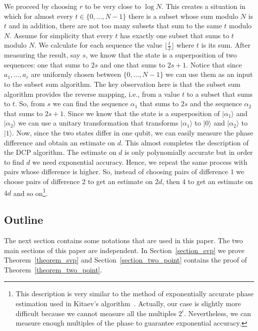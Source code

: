 \documentclass[11pt]{article}
\newcommand\ket[1]{{ |{#1} \rangle }}
\begin{document}
We proceed by choosing $r$ to be very close to $\log N$. This creates a situation in which for almost every
$t\in\{0,\ldots,N-1\}$ there is a subset whose sum modulo $N$ is $t$ and in addition, there are not too many subsets
that sum to the same $t$ modulo $N$. Assume for simplicity that every $t$ has exactly one subset that sums to $t$
modulo $N$. We calculate for each sequence the value $\lfloor \frac{t}{2} \rfloor$ where $t$ is its sum. After
measuring the result, say $s$, we know that the state is a superposition of two sequences: one that sums to $2s$ and
one that sums to $2s+1$. Notice that since $a_1,\ldots,a_r$ are uniformly chosen between $\{0,\ldots,N-1\}$ we can use
them as an input to the subset sum algorithm. The key observation here is that the subset sum algorithm provides the
reverse mapping, i.e., from a value $t$ to a subset that sums to $t$. So, from $s$ we can find the sequence $\alpha_1$
that sums to $2s$ and the sequence $\alpha_2$ that sums to $2s+1$. Since we know that the state is a superposition of
$\ket{\alpha_1}$ and $\ket{\alpha_2}$ we can use a unitary transformation that transforms $\ket{\alpha_1}$ to $\ket{0}$
and $\ket{\alpha_2}$ to $\ket{1}$. Now, since the two states differ in one qubit, we can easily measure the phase
difference and obtain an estimate on $d$. This almost completes the description of the DCP algorithm. The estimate on
$d$ is only polynomially accurate but in order to find $d$ we need exponential accuracy. Hence, we repeat the same
process with pairs whose difference is higher. So, instead of choosing pairs of difference $1$ we choose pairs of
difference $2$ to get an estimate on $2d$, then $4$ to get an estimate on $4d$ and so on\footnote{This description is
very similar to the method of exponentially accurate phase estimation used in Kitaev's
algorithm~\cite{KitaevAbelianSubgroup}. Actually, our case is slightly more difficult because we cannot measure all the
multiples $2^i$. Nevertheless, we can measure enough multiples of the phase to guarantee exponential accuracy.}.

\subsection*{Outline}

The next section contains some notations that are used in this paper. The two main sections of this paper are
independent. In Section~\ref{section_svp} we prove Theorem~\ref{theorem_svp} and Section~\ref{section_two_point}
contains the proof of Theorem~\ref{theorem_two_point}.
\end{document}
